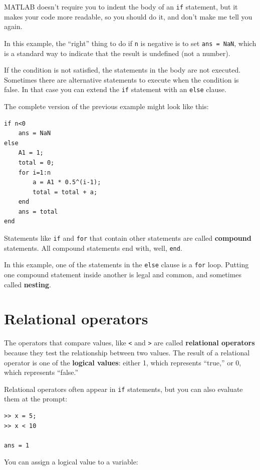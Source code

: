 \documentclass[
]{book}
\begin{document}
MATLAB doesn't require you to indent the body of an {\tt if}
statement, but it makes your code more readable, so you should do it,
and don't make me tell you again.

In this example, the ``right'' thing to do if {\tt n} is negative
is to set {\tt ans = NaN}, which is a standard way to indicate that
the result is undefined (not a number).

If the condition is not satisfied, the statements in the body are
not executed.  Sometimes there are alternative statements to
execute when the condition is false.  In that case you can extend
the {\tt if} statement with an {\tt else} clause.

The complete version of the previous example might look like this:

\begin{verbatim}
if n<0
    ans = NaN
else
    A1 = 1;
    total = 0;
    for i=1:n
        a = A1 * 0.5^(i-1);
        total = total + a;
    end
    ans = total
end
\end{verbatim}

Statements like {\tt if} and {\tt for} that contain other statements
are called {\bf compound} statements.  All compound statements end
with, well, {\tt end}.

In this example, one of the statements in the {\tt else} clause is a
{\tt for} loop.  Putting one compound statement inside another is
legal and common, and sometimes called {\bf nesting}.


\section{Relational operators}

The operators that compare values, like {\tt <} and {\tt >} are
called {\bf relational operators} because they test the relationship
between two values.  The result of a relational operator is one
of the {\bf logical values}:
either 1, which represents ``true,''  or 0, which represents ``false.''

Relational operators often appear in {\tt if} statements, but you
can also evaluate them at the prompt:

\begin{verbatim}
>> x = 5;
>> x < 10

ans = 1
\end{verbatim}

You can assign a logical value to a variable:
\end{document}
